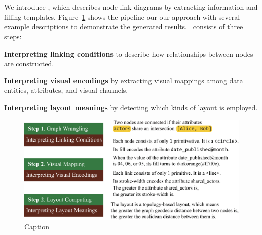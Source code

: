 \section{\ApproachName}
We introduce \ApproachName, which describes node-link diagrams by extracting information and filling templates.
Figure~\ref{fig:workflow} shows the pipeline our our approach with several example descriptions to demonstrate the generated results.
\ApproachName~consists of three steps:
\begin{compactenum}
\item \textbf{Interpreting linking conditions} to describe how relationships between nodes are constructed.
\item \textbf{Interpreting visual encodings} by extracting visual mappings among data entities, attributes, and visual channels.
\item \textbf{Interpreting layout meanings} by detecting which kinds of layout is employed.
\end{compactenum}


\begin{figure}
    \centering
    \includegraphics[width=1\columnwidth]{figures/workflow.eps}
    \caption{Caption}
    \label{fig:workflow}
\end{figure}

